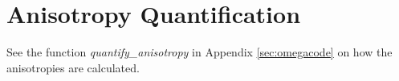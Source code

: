 \section{Anisotropy Quantification}
\label{sec:anisotropy_code}

See the function \textit{quantify\_anisotropy} in Appendix \ref{sec:omegacode}
on how the anisotropies are calculated.

